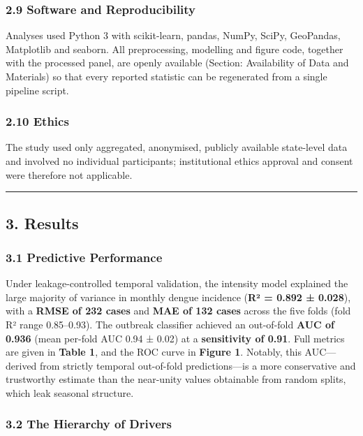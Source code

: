 \documentclass[
  10pt,
  twocolumn]{article}
\begin{document}
\subsubsection{2.9 Software and
Reproducibility}\label{software-and-reproducibility}

Analyses used Python 3 with scikit-learn, pandas, NumPy, SciPy,
GeoPandas, Matplotlib and seaborn. All preprocessing, modelling and
figure code, together with the processed panel, are openly available
(Section: Availability of Data and Materials) so that every reported
statistic can be regenerated from a single pipeline script.

\subsubsection{2.10 Ethics}\label{ethics}

The study used only aggregated, anonymised, publicly available
state-level data and involved no individual participants; institutional
ethics approval and consent were therefore not applicable.

\begin{center}\rule{0.5\linewidth}{0.5pt}\end{center}

\subsection{3. Results}\label{results}

\subsubsection{3.1 Predictive Performance}\label{predictive-performance}

Under leakage-controlled temporal validation, the intensity model
explained the large majority of variance in monthly dengue incidence
(\textbf{R² = 0.892 ± 0.028}), with a \textbf{RMSE of 232 cases} and
\textbf{MAE of 132 cases} across the five folds (fold R² range
0.85--0.93). The outbreak classifier achieved an out-of-fold \textbf{AUC
of 0.936} (mean per-fold AUC 0.94 ± 0.02) at a \textbf{sensitivity of
0.91}. Full metrics are given in \textbf{Table 1}, and the ROC curve in
\textbf{Figure 1}. Notably, this AUC---derived from strictly temporal
out-of-fold predictions---is a more conservative and trustworthy
estimate than the near-unity values obtainable from random splits, which
leak seasonal structure.

\subsubsection{3.2 The Hierarchy of
Drivers}\label{the-hierarchy-of-drivers}
\end{document}
